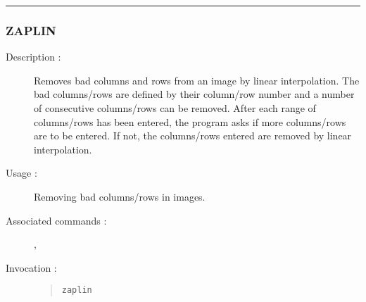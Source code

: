\hrule 
\subsubsection*{\label{ZAPLIN}ZAPLIN}

\begin{description}

\item[Description :] Removes bad columns and rows from an image by
linear interpolation.  The bad columns/rows are defined by their
column/row number and a number of consecutive columns/rows can be
removed.  After each range of columns/rows has been entered, the
program asks if more columns/rows are to be entered.  If not, the
columns/rows entered are removed by linear interpolation.

\item[Usage :] Removing bad columns/rows in images.

\item[Associated commands :] {\tt {}}, 
{\tt {}}

\item[Invocation :]

\begin{quote}{\tt  zaplin }\end{quote}

\end{description}





